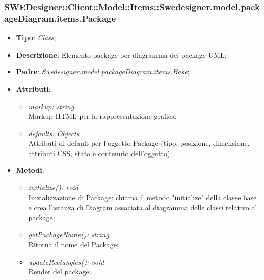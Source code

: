 \documentclass[../DefinizioneDiProdotto.tex]{subfiles}
\begin{document}
			\subsubsection{SWEDesigner::Client::Model::Items::Swedesigner.model.packageDiagram.items.Package}
			\hypertarget{SWEDesigner::Client::Model::Items::Swedesigner.model.packageDiagram.items.Package}{}
			\begin{itemize}
				\item \textbf{Tipo}: \emph{Class};
				\item \textbf{Descrizione}: Elemento package per diagramma dei package UML;
				\item \textbf{Padre}: \emph{Swedesigner.model.packageDiagram.items.Base};
				\item \textbf{Attributi}:
				\begin{itemize}
					\item \emph{markup: string}\\
					Markup HTML per la rappresentazione grafica;
					\item \emph{defaults: Objects}\\
					Attributi di default per l'oggetto Package (tipo, posizione, dimensione, attributi CSS, stato e contenuto dell'oggetto);
				\end{itemize}
				\item \textbf{Metodi}:
				\begin{itemize}
					\item \emph{initialize(): void}\\
					Inizializzazione di Package: chiama il metodo "initialize" della classe base e crea l'istanza di Diagram associata al diagramma delle classi relativo al package;
					\item \emph{getPackageName(): string}\\
					Ritorna il nome del Package;
					\item \emph{updateRectangles(): void}\\
					Render del package;
				\end{itemize}
			\end{itemize}
			
\end{document}
